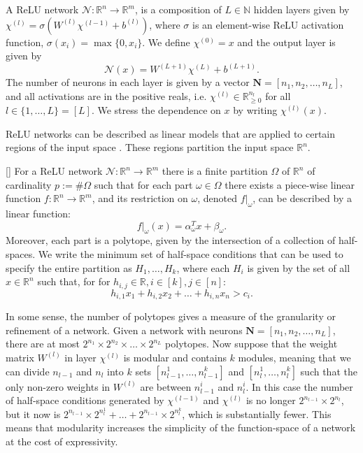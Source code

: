 \begin{definition}
A ReLU network $\mathcal{N} \colon \mathbb{R}^n \rightarrow \mathbb{R}^m$, is a composition of $L \in \mathbb{N}$ hidden layers given by $\chi^{(l)} = \sigma( {W^{(l)}} \chi^{(l-1)} + b^{(l)})$, where $\sigma$ is an element-wise ReLU activation function, $\sigma(x_i) = \max\{0,x_i\}$. We define $\chi^{(0)} = x$ and the output layer is given by 
\[\mathcal{N}(x) = W^{(L+1)} \chi^{(L)} + b^{(L+1)}.\] 
The number of neurons in each layer is given by a vector $\mathbf{N} = [n_1, n_2, \ldots, n_L]$, and all activations are in the positive reals, i.e. $\chi^{(l)} \in \mathbb{R}^{n_l}_{\geq 0}$ for all $l \in \{1,\ldots,L\} = [L]$. We stress the dependence on $x$ by writing $\chi^{(l)}(x)$.
\end{definition}

ReLU networks can be described as linear models that are applied to certain regions of the input space \citep{sudjianto2020unwrapping}. These regions partition the input space $\mathbb{R}^n$. 

\begin{proposition}\label{prop:network-to-partition}[\citet{sudjianto2020unwrapping}]
For a ReLU network $\mathcal{N} \colon \mathbb{R}^n \rightarrow \mathbb{R}^m$ there is a finite partition $\Omega$ of $\mathbb{R}^n$ of cardinality $p := \# \Omega$ such that for each part $\omega \in \Omega$ there exists a piece-wise linear function $f\colon \mathbb{R}^n \rightarrow \mathbb{R}^m$, and its restriction on $\omega$, denoted $f|_\omega$, can be described by a linear function: 
\[f|_\omega (x) = \alpha_\omega^T x + \beta_\omega.\]
Moreover, each part is a  polytope, given by the intersection of a collection of half-spaces.
We write the minimum set of half-space conditions that can be used to specify the entire partition as $H_1,\ldots,H_k$, where each $H_i$ is given by the set of all $x \in \mathbb{R}^n$ such that, for for $h_{i,j} \in \mathbb{R}, i\in [k], j\in [n]$:
\[ h_{i,1} x_1 + h_{i,2} x_2 + \ldots + h_{i,n} x_n  > c_i.\]
\end{proposition}

In some sense, the number of polytopes gives a measure of the granularity or refinement of a network.
Given a network with neurons $\mathbf{N} = [n_1, n_2, \ldots, n_L]$, 
there are at most $2^{n_1} \times 2^{n_2} \times \ldots \times 2^{n_L}$ polytopes. Now suppose that the weight matrix $W^{(l)}$ in layer $\chi^{(l)}$ is modular and contains $k$ modules, meaning that we can divide $n_{l-1}$ and $n_{l}$ into $k$ sets $[n_{l-1}^1, \ldots, n_{l-1}^k]$ and $[n_{l}^1, \ldots, n_{l}^k]$ such that the only non-zero weights in $W^{(l)}$ are between $n_{l-1}^i$ and $n_{l}^i$.
In this case the number of half-space conditions generated by $\chi^{(l-1)}$ and $\chi^{(l)}$ is no longer $2^{n_{l-1}} \times 2^{n_l}$, but it now is $2^{n_{l-1}} \times 2^{n_{l}^1} + \ldots + 2^{n_{l-1}} \times 2^{n_{l}^k}$, which is substantially fewer.
This means that modularity increases the simplicity of the function-space of a network at the cost of expressivity.

